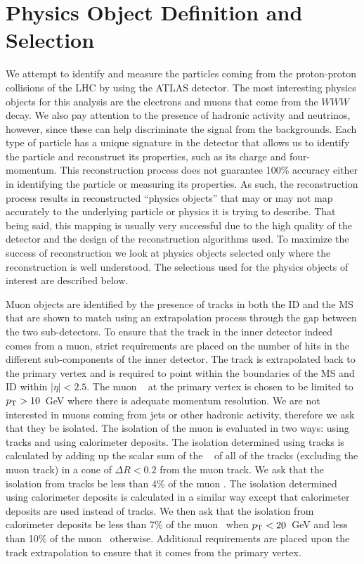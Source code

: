 \section{Physics Object Definition and Selection}
\label{sec:object_selection}
We attempt to identify and measure the particles coming from
the proton-proton collisions of the LHC by using the ATLAS detector.
The most interesting physics objects
for this analysis are the electrons and muons
that come from the $WWW$ decay. We also pay attention to 
the presence of hadronic activity and neutrinos, however, since these can
help discriminate the signal from the backgrounds.
Each type of particle has a unique signature in the detector
that allows us to identify the particle and reconstruct 
its properties, such as its charge and four-momentum. 
This reconstruction process does not guarantee
100\% accuracy either in identifying the particle or measuring its 
properties. As such, the reconstruction process results in reconstructed
``physics objects'' that may or may not map accurately 
to the underlying particle or physics it is trying to describe. That 
being said, this mapping is usually very successful due to the high quality
of the detector and the design of the reconstruction algorithms used.
To maximize the success of reconstruction we look at physics
objects selected only where the reconstruction is well understood.
The selections used for the physics objects of interest are described below.


Muon objects are identified by the presence of tracks in both 
the ID and the MS that are shown 
to match using an extrapolation process through the gap between the
two sub-detectors. To ensure that the track in the inner detector
indeed comes from a muon, strict requirements are placed
on the number of hits in the different sub-components of the inner detector.
The track is extrapolated back to the primary vertex and is required
to point within the boundaries of the MS and ID
within $|\eta|<2.5$.
The muon \pt~ at the primary vertex is chosen to be limited to $p_{\mathrm{T}} > 10$~GeV
where there is adequate momentum resolution. We are not interested in 
muons coming from jets or other hadronic activity, therefore we
ask that they be isolated. The isolation of the muon is evaluated
in two ways: using tracks and using calorimeter deposits.
The isolation determined using tracks is calculated by adding
up the scalar sum of the \pt~ of all of the tracks (excluding
the muon track) in a cone of $\Delta R< 0.2$ from the muon track.
We ask that the isolation from tracks be less than 4\% of the muon \pt.
The isolation determined using calorimeter deposits is calculated in
a similar way except that calorimeter deposits are used instead of tracks.
We then ask that the isolation from calorimeter deposits 
be less than 7\% of the muon \pt~when $p_{\mathrm{T}} < 20$~GeV and 
less than 10\% of the muon \pt~otherwise. Additional requirements
are placed upon the track extrapolation to ensure that it comes from
the primary vertex.


